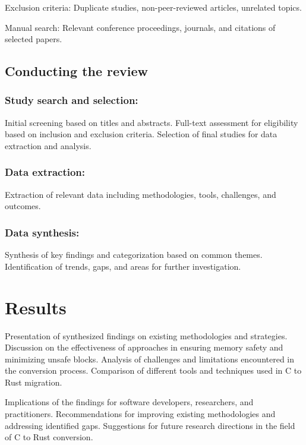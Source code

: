 \documentclass[sigconf]{acmart}
\begin{document}
Exclusion criteria: Duplicate studies, non-peer-reviewed articles, unrelated topics.

Manual search: Relevant conference proceedings, journals, and citations of selected papers.

\subsection{Conducting the review}

\subsubsection{Study search and selection:}

Initial screening based on titles and abstracts.  Full-text assessment for eligibility based on
inclusion and exclusion criteria.  Selection of final studies for data extraction and analysis.

\subsubsection{Data extraction:}

Extraction of relevant data including methodologies, tools, challenges, and outcomes.

\subsubsection{Data synthesis:}

Synthesis of key findings and categorization based on common themes.
Identification of trends, gaps, and areas for further investigation.

\section{Results}

Presentation of synthesized findings on existing methodologies and strategies.  Discussion on the
effectiveness of approaches in ensuring memory safety and minimizing unsafe blocks.  Analysis of
challenges and limitations encountered in the conversion process.  Comparison of different tools and
techniques used in C to Rust migration.

Implications of the findings for software developers, researchers, and practitioners.
Recommendations for improving existing methodologies and addressing identified gaps.
Suggestions for future research directions in the field of C to Rust conversion.
\end{document}
